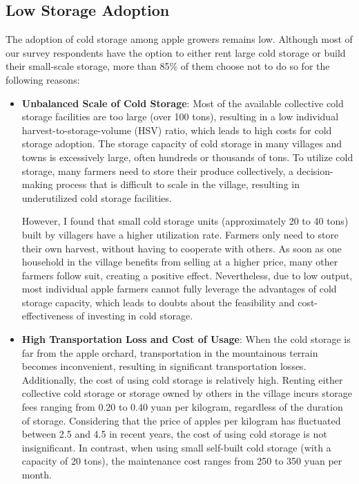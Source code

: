 \subsection{Low Storage Adoption}
\noindent The adoption of cold storage among apple growers remains low. Although most of our survey respondents have the option to either rent large cold storage or build their small-scale storage, more than 85\% of them choose not to do so for the following reasons:
\begin{itemize}
    \item \textbf{Unbalanced Scale of Cold Storage}: Most of the available collective cold storage facilities are too large (over 100 tons), resulting in a low individual harvest-to-storage-volume (HSV) ratio, which leads to high costs for cold storage adoption. The storage capacity of cold storage in many villages and towns is excessively large, often hundreds or thousands of tons. To utilize cold storage, many farmers need to store their produce collectively, a decision-making process that is difficult to scale in the village, resulting in underutilized cold storage facilities. 
    
    However, I found that small cold storage units (approximately 20 to 40 tons) built by villagers have a higher utilization rate. Farmers only need to store their own harvest, without having to cooperate with others. As soon as one household in the village benefits from selling at a higher price, many other farmers follow suit, creating a positive effect. Nevertheless, due to low output, most individual apple farmers cannot fully leverage the advantages of cold storage capacity, which leads to doubts about the feasibility and cost-effectiveness of investing in cold storage.

    \item \textbf{High Transportation Loss and Cost of Usage}: When the cold storage is far from the apple orchard, transportation in the mountainous terrain becomes inconvenient, resulting in significant transportation losses. Additionally, the cost of using cold storage is relatively high. Renting either collective cold storage or storage owned by others in the village incurs storage fees ranging from 0.20 to 0.40 yuan per kilogram, regardless of the duration of storage. Considering that the price of apples per kilogram has fluctuated between 2.5 and 4.5 in recent years, the cost of using cold storage is not insignificant. In contrast, when using small self-built cold storage (with a capacity of 20 tons), the maintenance cost ranges from 250 to 350 yuan per month.
    

\end{itemize}
